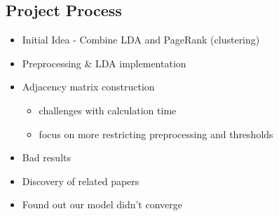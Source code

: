 \subsection{Project Process}
\begin{itemize}
	\item Initial Idea - Combine LDA and PageRank (clustering)
	\item Preprocessing \& LDA implementation
	\item Adjacency matrix construction
	\begin{itemize}
		\item challenges with calculation time
		\item focus on more restricting preprocessing and thresholds
	\end{itemize}
	\item Bad results
	\item Discovery of related papers
	\item Found out our model didn't converge
\end{itemize}